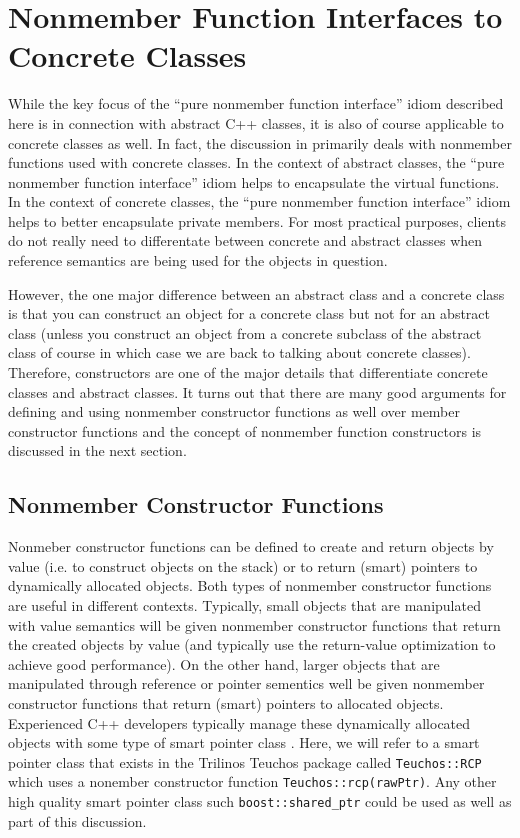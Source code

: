 \documentclass[pdf,ps2pdf,11pt]{SANDreport}
\begin{document}

%
\section{Nonmember Function Interfaces to Concrete Classes}
%

While the key focus of the ``pure nonmember function interface'' idiom
described here is in connection with abstract C++ classes, it is also of
course applicable to concrete classes as well.  In fact, the discussion in
{}\cite[Item 23]{EffectiveC++3rd} primarily deals with nonmember functions
used with concrete classes.  In the context of abstract classes, the ``pure
nonmember function interface'' idiom helps to encapsulate the virtual
functions.  In the context of concrete classes, the ``pure nonmember function
interface'' idiom helps to better encapsulate private members.  For most
practical purposes, clients do not really need to differentate between
concrete and abstract classes when reference semantics are being used for the
objects in question.

However, the one major difference between an abstract class and a concrete
class is that you can construct an object for a concrete class but not for an
abstract class (unless you construct an object from a concrete subclass of the
abstract class of course in which case we are back to talking about concrete
classes).  Therefore, constructors are one of the major details that
differentiate concrete classes and abstract classes.  It turns out that there
are many good arguments for defining and using nonmember constructor functions
as well over member constructor functions and the concept of nonmember
function constructors is discussed in the next section.

%
\subsection{Nonmember Constructor Functions}
%

Nonmeber constructor functions can be defined to create and return objects by
value (i.e. to construct objects on the stack) or to return (smart) pointers
to dynamically allocated objects.  Both types of nonmember constructor
functions are useful in different contexts.  Typically, small objects that are
manipulated with value semantics will be given nonmember constructor functions
that return the created objects by value (and typically use the return-value
optimization to achieve good performance).  On the other hand, larger objects
that are manipulated through reference or pointer sementics well be given
nonmember constructor functions that return (smart) pointers to allocated
objects.  Experienced C++ developers typically manage these dynamically
allocated objects with some type of smart pointer class {}\cite[Item
13]{C++CodingStandards05}.  Here, we will refer to a smart pointer class that
exists in the Trilinos Teuchos package called {}\texttt{Teuchos\-::RCP}
{}\cite{RefCountPtrBeginnersGuide} which uses a nonember constructor function
{}\texttt{Teuchos\-::rcp(rawPtr)}.  Any other high quality smart pointer class
such {}\texttt{boost\-::shared\_ptr} could be used as well as part of this
discussion.
\end{document}

